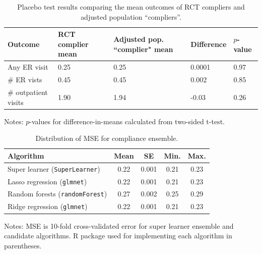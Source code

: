 \documentclass[hidelinks,12pt]{article}
\begin{document}
{\begin{appendices}
\begin{table}[h]
	\begin{center}
		\caption{Placebo test results comparing the mean outcomes of RCT compliers and adjusted population ``compliers''.\label{placebo}} 
	\begin{tabular}{@{}lllll@{}}
		\toprule
		Outcome                & RCT complier mean & Adjusted pop. ``complier" mean & Difference & $p$-value \\ \midrule
		Any ER visit           & 0.25              & 0.25                           & 0.0001     & 0.97    \\
		$\#$ ER vists          & 0.45              & 0.45                           & 0.002      & 0.85    \\
		$\#$ outpatient visits & 1.90              & 1.94                           & -0.03      & 0.26    \\ \bottomrule
	\end{tabular}
\end{center}
\footnotesize{Notes: $p$-values for difference-in-means calculated from two-sided t-test.}
\end{table}

\begin{table}[h]
\begin{center}
\caption{Distribution of MSE for compliance ensemble.\label{compliance-ensemble}} 
\begin{tabular}{lcccc}
  \hline
 Algorithm & Mean & SE & Min. & Max. \\ 
  \hline
        \rowcolor{Gray}
Super learner (\texttt{SuperLearner}) & 0.22  & 0.001 & 0.21 & 0.23 \\
Lasso regression (\texttt{glmnet})  & 0.22  & 0.001 & 0.21 & 0.23 \\
Random forests (\texttt{randomForest}) & 0.27  & 0.002 & 0.25 & 0.29 \\
Ridge regression (\texttt{glmnet}) & 0.22  & 0.001 & 0.21 & 0.23 \\
   \hline
\end{tabular} 
\end{center}
\footnotesize{{\color{red}Notes: MSE is 10-fold cross-validated error for super learner ensemble and candidate algorithms. \textsf{R} package used for implementing each algorithm in parentheses.}}
\end{table}

\pagebreak


\end{appendices}}
\end{document}
